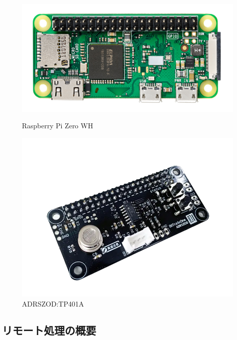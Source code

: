 \documentclass[12pt,a4paper,uplatex]{jsarticle}
\begin{document}
\begin{figure}[H]
	\begin{minipage}[b]{0.45\linewidth}
		\centering
		\includegraphics[keepaspectratio, scale=0.13]{figs/jpg/udrpzwh.jpg}
		\caption{Raspberry Pi Zero WH}
	\end{minipage}
	\hspace{1.0cm}
	\begin{minipage}[b]{0.45\linewidth}
		\centering
		\includegraphics[keepaspectratio, scale=0.25]{figs/png/nioi_sensor.png}
		\caption{ADRSZOD:TP401A}
	\end{minipage}
\end{figure}

\subsection{リモート処理の概要}
\end{document}

